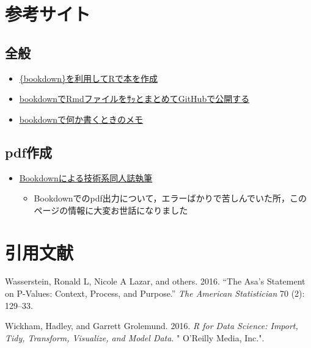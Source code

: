\documentclass[xelatex, ja=standard, b5paper]{bxjsbook}
\providecommand{\tightlist}{%
  \setlength{\itemsep}{0pt}\setlength{\parskip}{0pt}}
\begin{document}
\hypertarget{sanko}{%
\chapter{参考サイト}\label{sanko}}

\hypertarget{sanko_general}{%
\section{全般}\label{sanko_general}}

\begin{itemize}
\tightlist
\item
  \href{https://qiita.com/kazutan/items/40b45d4aaba88a4ed706}{\{bookdown\}を利用してRで本を作成}
\item
  \href{https://qiita.com/nozma/items/489497fe246ff8533bf9}{bookdownでRmdファイルをｻｯとまとめてGitHubで公開する}
\item
  \href{https://qiita.com/nozma/items/979fcb78275bf5b1628f}{bookdownで何か書くときのメモ}
\end{itemize}

\hypertarget{sanko_pdf}{%
\section{pdf作成}\label{sanko_pdf}}

\begin{itemize}
\tightlist
\item
  \href{https://teastat.blogspot.com/2019/01/bookdown.html}{Bookdownによる技術系同人誌執筆}

  \begin{itemize}
  \tightlist
  \item
    Bookdownでのpdf出力について，エラーばかりで苦しんでいた所，このページの情報に大変お世話になりました
  \end{itemize}
\end{itemize}

\hypertarget{reference}{%
\chapter*{引用文献}\label{reference}}

\hypertarget{refs}{}
\leavevmode\hypertarget{ref-wasserstein2016asa}{}%
Wasserstein, Ronald L, Nicole A Lazar, and others. 2016. ``The Asa's Statement on P-Values: Context, Process, and Purpose.'' \emph{The American Statistician} 70 (2): 129--33.

\leavevmode\hypertarget{ref-wickham2016r}{}%
Wickham, Hadley, and Garrett Grolemund. 2016. \emph{R for Data Science: Import, Tidy, Transform, Visualize, and Model Data}. " O'Reilly Media, Inc.".
\end{document}

